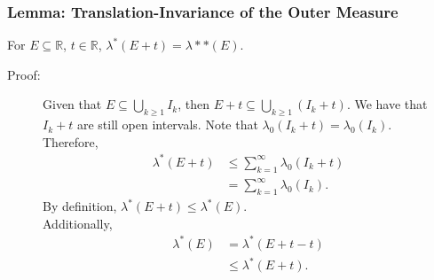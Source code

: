 \documentclass[10pt]{extarticle}
\newcommand{\R}{\mathbb{R}}
\begin{document}
  \subsubsection{Lemma: Translation-Invariance of the Outer Measure}%
  For $E\subseteq \R$, $t\in \R$, $\lambda^{\ast}(E + t) = \lambda*{\ast}(E)$.
  \begin{description}
    \item[Proof:] Given that $E\subseteq \bigcup_{k\geq 1} I_k$, then $E + t \subseteq \bigcup_{k\geq 1}(I_k + t)$. We have that $I_k + t$ are still open intervals. Note that $\lambda_{0}(I_k + t) = \lambda_0(I_k)$.\\

      Therefore,
      \begin{align*}
        \lambda^{\ast}(E + t) &\leq \sum_{k=1}^{\infty}\lambda_0(I_k + t)\\
                              &= \sum_{k=1}^{\infty}\lambda_0(I_k).
      \end{align*}
      By definition, $\lambda^{\ast}(E + t) \leq \lambda^{\ast}(E)$.\\

      Additionally,
      \begin{align*}
        \lambda^{\ast}(E) &= \lambda^{\ast}(E + t - t)\\
                          &\leq \lambda^{\ast}(E + t).
      \end{align*}
  \end{description}
\end{document}
